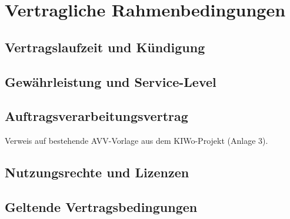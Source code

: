 \chapter{Vertragliche Rahmenbedingungen}

\section{Vertragslaufzeit und Kündigung}


\section{Gewährleistung und Service-Level}


\section{Auftragsverarbeitungsvertrag}

Verweis auf bestehende AVV-Vorlage aus dem KIWo-Projekt (Anlage 3).

\section{Nutzungsrechte und Lizenzen}


\section{Geltende Vertragsbedingungen}

